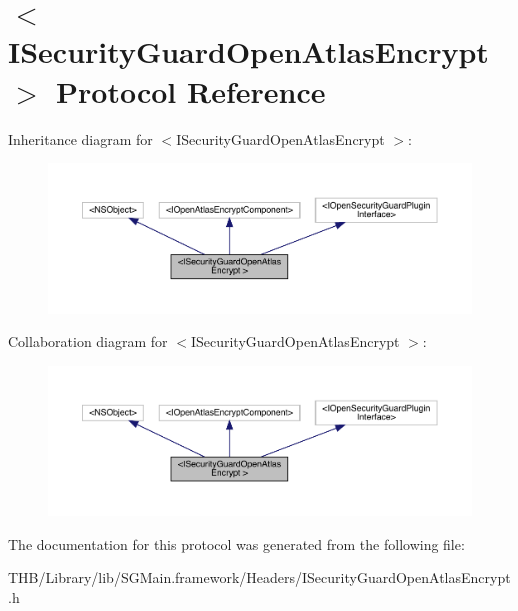\hypertarget{protocol_i_security_guard_open_atlas_encrypt_01-p}{}\section{$<$I\+Security\+Guard\+Open\+Atlas\+Encrypt $>$ Protocol Reference}
\label{protocol_i_security_guard_open_atlas_encrypt_01-p}


Inheritance diagram for $<$I\+Security\+Guard\+Open\+Atlas\+Encrypt $>$\+:\nopagebreak
\begin{figure}[H]
\begin{center}
\leavevmode
\includegraphics[width=350pt]{protocol_i_security_guard_open_atlas_encrypt_01-p__inherit__graph}
\end{center}
\end{figure}


Collaboration diagram for $<$I\+Security\+Guard\+Open\+Atlas\+Encrypt $>$\+:\nopagebreak
\begin{figure}[H]
\begin{center}
\leavevmode
\includegraphics[width=350pt]{protocol_i_security_guard_open_atlas_encrypt_01-p__coll__graph}
\end{center}
\end{figure}


The documentation for this protocol was generated from the following file\+:\begin{DoxyCompactItemize}
\item 
T\+H\+B/\+Library/lib/\+S\+G\+Main.\+framework/\+Headers/I\+Security\+Guard\+Open\+Atlas\+Encrypt.\+h\end{DoxyCompactItemize}

